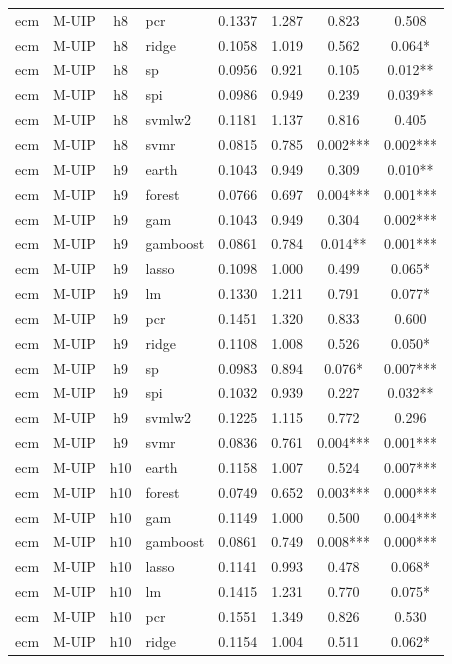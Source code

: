 \begin{ThreePartTable}
\begin{longtable}[t]{llclcccc}
ecm & M-UIP & h8 & pcr & 0.1337 & 1.287 & 0.823 & 0.508\\
ecm & M-UIP & h8 & ridge & 0.1058 & 1.019 & 0.562 & 0.064*\\
ecm & M-UIP & h8 & sp & 0.0956 & 0.921 & 0.105 & 0.012**\\
ecm & M-UIP & h8 & spi & 0.0986 & 0.949 & 0.239 & 0.039**\\
ecm & M-UIP & h8 & svmlw2 & 0.1181 & 1.137 & 0.816 & 0.405\\
ecm & M-UIP & h8 & svmr & 0.0815 & 0.785 & 0.002*** & 0.002***\\
\addlinespace
ecm & M-UIP & h9 & earth & 0.1043 & 0.949 & 0.309 & 0.010**\\
ecm & M-UIP & h9 & forest & 0.0766 & 0.697 & 0.004*** & 0.001***\\
ecm & M-UIP & h9 & gam & 0.1043 & 0.949 & 0.304 & 0.002***\\
ecm & M-UIP & h9 & gamboost & 0.0861 & 0.784 & 0.014** & 0.001***\\
ecm & M-UIP & h9 & lasso & 0.1098 & 1.000 & 0.499 & 0.065*\\
ecm & M-UIP & h9 & lm & 0.1330 & 1.211 & 0.791 & 0.077*\\
ecm & M-UIP & h9 & pcr & 0.1451 & 1.320 & 0.833 & 0.600\\
ecm & M-UIP & h9 & ridge & 0.1108 & 1.008 & 0.526 & 0.050*\\
ecm & M-UIP & h9 & sp & 0.0983 & 0.894 & 0.076* & 0.007***\\
ecm & M-UIP & h9 & spi & 0.1032 & 0.939 & 0.227 & 0.032**\\
ecm & M-UIP & h9 & svmlw2 & 0.1225 & 1.115 & 0.772 & 0.296\\
ecm & M-UIP & h9 & svmr & 0.0836 & 0.761 & 0.004*** & 0.001***\\
\addlinespace
ecm & M-UIP & h10 & earth & 0.1158 & 1.007 & 0.524 & 0.007***\\
ecm & M-UIP & h10 & forest & 0.0749 & 0.652 & 0.003*** & 0.000***\\
ecm & M-UIP & h10 & gam & 0.1149 & 1.000 & 0.500 & 0.004***\\
ecm & M-UIP & h10 & gamboost & 0.0861 & 0.749 & 0.008*** & 0.000***\\
ecm & M-UIP & h10 & lasso & 0.1141 & 0.993 & 0.478 & 0.068*\\
ecm & M-UIP & h10 & lm & 0.1415 & 1.231 & 0.770 & 0.075*\\
ecm & M-UIP & h10 & pcr & 0.1551 & 1.349 & 0.826 & 0.530\\
ecm & M-UIP & h10 & ridge & 0.1154 & 1.004 & 0.511 & 0.062*\\

\end{longtable}
\end{ThreePartTable}
